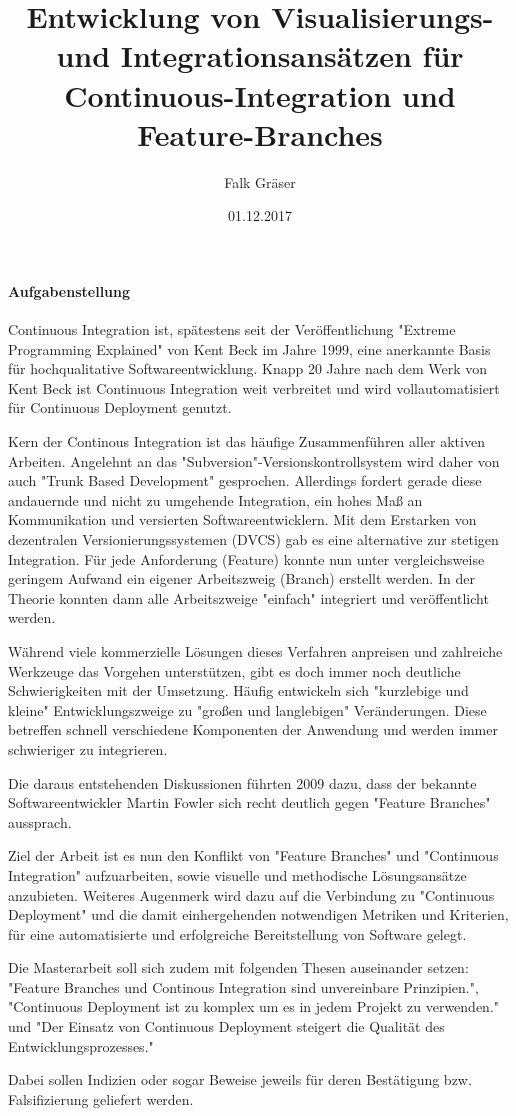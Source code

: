 \documentclass[11pt,english,german]{article}
\begin{document}
\sffamily

\title{\textbf{Entwicklung von Visualisierungs- und Integrationsansätzen für Continuous-Integration und Feature-Branches}}
\author{Falk Gräser}
\date{01.12.2017}

\maketitle
{}

\paragraph{\textsf{Aufgabenstellung}}
Continuous Integration ist, spätestens seit der Veröffentlichung "Extreme Programming Explained" von Kent Beck im Jahre 1999, eine anerkannte Basis für hochqualitative Softwareentwicklung. Knapp 20 Jahre nach dem Werk von Kent Beck ist Continuous Integration weit verbreitet und wird vollautomatisiert für Continuous Deployment genutzt.

Kern der Continous Integration ist das häufige Zusammenführen aller aktiven Arbeiten. Angelehnt an das "Subversion"-Versionskontrollsystem wird daher von auch "Trunk Based Development" gesprochen.
Allerdings fordert gerade diese andauernde und nicht zu umgehende Integration, ein hohes Maß an Kommunikation und versierten Softwareentwicklern.
Mit dem Erstarken von dezentralen Versionierungssystemen (DVCS) gab es eine alternative zur stetigen Integration. Für jede Anforderung (Feature) konnte nun unter vergleichsweise geringem Aufwand ein eigener Arbeitszweig (Branch) erstellt werden. In der Theorie konnten
dann alle Arbeitszweige "einfach" integriert und veröffentlicht werden.

Während viele kommerzielle Lösungen dieses Verfahren anpreisen und zahlreiche Werkzeuge das Vorgehen unterstützen, gibt es doch immer noch deutliche Schwierigkeiten mit der Umsetzung. Häufig entwickeln sich "kurzlebige und kleine" Entwicklungszweige zu "großen und langlebigen" Veränderungen. Diese betreffen schnell verschiedene Komponenten der Anwendung und werden immer schwieriger zu integrieren.

Die daraus entstehenden Diskussionen führten 2009 dazu, dass der bekannte Softwareentwickler Martin Fowler sich recht deutlich gegen "Feature Branches" aussprach.

Ziel der Arbeit ist es nun den Konflikt von "Feature Branches" und "Continuous Integration" aufzuarbeiten, sowie visuelle und methodische Lösungsansätze anzubieten.
Weiteres Augenmerk wird dazu auf die Verbindung zu "Continuous Deployment" und die damit einhergehenden notwendigen Metriken und Kriterien, für eine automatisierte und erfolgreiche Bereitstellung von Software gelegt.

Die Masterarbeit soll sich zudem mit folgenden Thesen auseinander setzen:
"Feature Branches und Continous Integration sind unvereinbare Prinzipien.",
"Continuous Deployment ist zu komplex um es in jedem Projekt zu verwenden." und
"Der Einsatz von Continuous Deployment steigert die Qualität des Entwicklungsprozesses."

Dabei sollen Indizien oder sogar Beweise jeweils für deren Bestätigung bzw. Falsifizierung geliefert werden.
\end{document}
